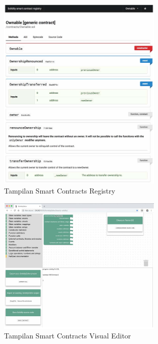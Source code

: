 \begin{figure}[ht]
  \centering
  \includegraphics[width=0.7\textwidth]{resources/chapter-2/sc-registry.png}
  \caption{Tampilan Smart Contracts Registry \parencite{guida2019supporting}}
  \label{image:sc-registry}
\end{figure}

\begin{figure}[ht]
  \centering
  \includegraphics[width=0.7\textwidth]{resources/chapter-2/sc-editor.png}
  \caption{Tampilan Smart Contracts Visual Editor \parencite{guida2019supporting}}
  \label{image:sc-editor}
\end{figure}

